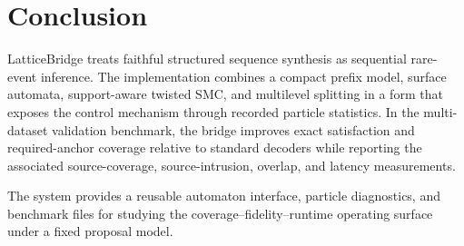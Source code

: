 \documentclass[11pt]{article}
\begin{document}
\section{Conclusion}
LatticeBridge treats faithful structured sequence synthesis as sequential rare-event inference. The implementation combines a compact prefix model, surface automata, support-aware twisted SMC, and multilevel splitting in a form that exposes the control mechanism through recorded particle statistics. In the multi-dataset validation benchmark, the bridge improves exact satisfaction and required-anchor coverage relative to standard decoders while reporting the associated source-coverage, source-intrusion, overlap, and latency measurements.

The system provides a reusable automaton interface, particle diagnostics, and benchmark files for studying the coverage--fidelity--runtime operating surface under a fixed proposal model.
\end{document}
